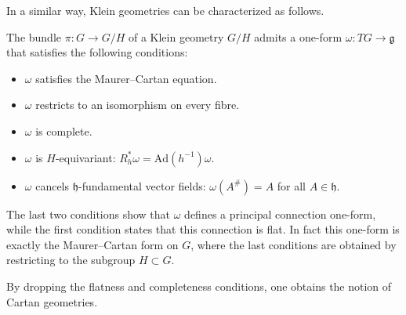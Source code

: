     In a similar way, Klein geometries can be characterized as follows.
    \begin{property}
        The bundle $\pi:G\rightarrow G/H$ of a Klein geometry $G/H$ admits a one-form $\omega:TG\rightarrow\mathfrak{g}$ that satisfies the following conditions:
        \begin{itemize}
            \item $\omega$ satisfies the Maurer--Cartan equation.
            \item $\omega$ restricts to an isomorphism on every fibre.
            \item $\omega$ is complete.
            \item $\omega$ is $H$-equivariant: $R_h^*\omega=\mathrm{Ad}(h^{-1})\omega$.
            \item $\omega$ cancels $\mathfrak{h}$-fundamental vector fields: $\omega(A^\#)=A$ for all $A\in\mathfrak{h}$.
        \end{itemize}
    \end{property}
    The last two conditions show that $\omega$ defines a principal connection one-form, while the first condition states that this connection is flat. In fact this one-form is exactly the Maurer--Cartan form on $G$, where the last conditions are obtained by restricting to the subgroup $H\subset G$.

    By dropping the flatness and completeness conditions, one obtains the notion of Cartan geometries.

